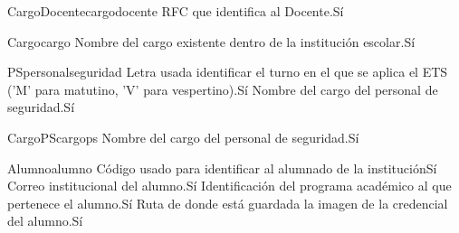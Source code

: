 \begin{cdtEntidad}{CargoDocente}{cargodocente}
	{RFC que identifica al Docente.}{Sí}
\end{cdtEntidad}
\begin{cdtEntidad}{Cargo}{cargo}
	{Nombre del cargo existente dentro de la institución escolar.}{Sí}
\end{cdtEntidad}
\begin{cdtEntidad}{PS}{personalseguridad}
	{Letra usada identificar el turno en el que se aplica el ETS ('M' para matutino, 'V' para vespertino).}{Sí}
	{Nombre del cargo del personal de seguridad.}{Sí}
\end{cdtEntidad}
\begin{cdtEntidad}{CargoPS}{cargops}
	{Nombre del cargo del personal de seguridad.}{Sí}
\end{cdtEntidad}
\begin{cdtEntidad}{Alumno}{alumno}
	{Código usado para identificar al alumnado de la institución}{Sí}
	{Correo institucional del alumno.}{Sí}
	{Identificación del programa académico al que pertenece el alumno.}{Sí}
	{Ruta de donde está guardada la imagen de la credencial del alumno.}{Sí}
\end{cdtEntidad}
